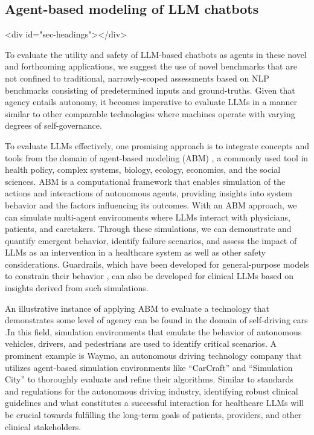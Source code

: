 \documentclass[10pt]{article}
\begin{document}
\begin{multicols}{2}
\section{Agent-based modeling of LLM chatbots}
<div id="sec-headings"></div>

To evaluate the utility and safety of LLM-based chatbots as agents in these novel and forthcoming applications, we suggest the use of novel benchmarks that are not confined to traditional, narrowly-scoped assessments based on NLP benchmarks consisting of predetermined inputs and ground-truths. Given that agency entails autonomy, it becomes imperative to evaluate LLMs in a manner similar to other comparable technologies where machines operate with varying degrees of self-governance.

To evaluate LLMs effectively, one promising approach is to integrate concepts and tools from the domain of agent-based modeling (ABM) \cite{bankes2002agent}, a commonly used tool in health policy, complex systems, biology, ecology, economics, and the social sciences. ABM is a computational framework that enables simulation of the actions and interactions of autonomous agents, providing insights into system behavior and the factors influencing its outcomes. With an ABM approach, we can simulate multi-agent environments where LLMs interact with physicians, patients, and caretakers. Through these simulations, we can demonstrate and quantify emergent behavior, identify failure scenarios, and assess the impact of LLMs as an intervention in a healthcare system as well as other safety considerations. Guardrails, which have been developed for general-purpose models to constrain their behavior \cite{nvidia}, can also be developed for clinical LLMs based on insights derived from such simulations.

An illustrative instance of applying ABM to evaluate a technology that demonstrates some level of agency can be found in the domain of self-driving cars \cite{fagnant2014travel}.In this field, simulation environments that emulate the behavior of autonomous vehicles, drivers, and pedestrians are used to identify critical scenarios. A prominent example is Waymo, an autonomous driving technology company that utilizes agent-based simulation environments like “CarCraft” \cite{waymo1} and “Simulation City” \cite{waymo2} to thoroughly evaluate and refine their algorithms. Similar to standards and regulations for the autonomous driving industry, identifying robust clinical guidelines and what constitutes a successful interaction for healthcare LLMs will be crucial towards fulfilling the long-term goals of patients, providers, and other clinical stakeholders.


\end{multicols}
\end{document}
